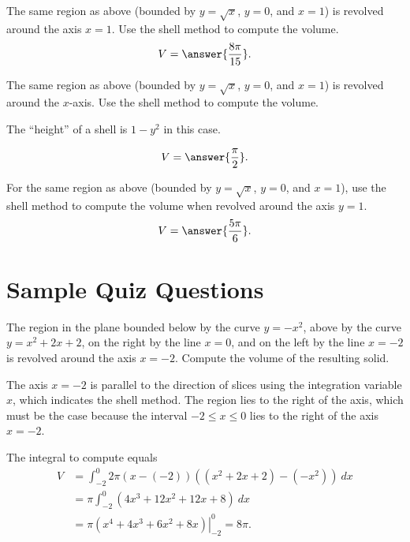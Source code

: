 \documentclass{ximera}
\begin{document}
\begin{exercise}
The same region as above (bounded by $y = \sqrt{x}$, $y=0$, and $x = 1$) is revolved around the axis $x=1$. Use the shell method to compute the volume.
\[ V = \answer{\frac{8 \pi}{15}}. \]
\end{exercise}

\begin{exercise}
The same region as above  (bounded by $y = \sqrt{x}$, $y=0$, and $x = 1$) is revolved around the $x$-axis. Use the shell method to compute the volume.
\begin{hint}
The ``height'' of a shell is $1-y^2$ in this case.
\end{hint}
\[ V = \answer{\frac{\pi}{2}}. \]
\end{exercise}

\begin{exercise}
For the same region as above (bounded by $y = \sqrt{x}$, $y=0$, and $x = 1$), use the shell method to compute the volume when revolved around the axis $y = 1$.
\[ V = \answer{\frac{5 \pi}{6}}. \]
\end{exercise}

\section*{Sample Quiz Questions}

\begin{question}%

The region in the plane bounded below by the curve \(y=-x^2\), above by the curve \(y=x^2+2x+2\), on the right by the line  \(x = 0\), and on the left by the line \(x = -2\) is revolved around the axis \(x = -2\). Compute the volume of the resulting solid.
\begin{multiplechoice}
\choice{\(4\pi\)}
\choice{\(6\pi\)}
\choice[correct]{\(8\pi\)}
\choice{\(10\pi\)}
\choice{\(12\pi\)}
\choice{\(14\pi\)}
\end{multiplechoice}
\begin{feedback}
The axis \(x = -2\) is parallel to the direction of slices using the integration variable \(x\), which indicates the shell method. 
 The region lies to the right of the axis, which must be the case because the interval \(-2 \leq x \leq 0\) lies to the right of the axis \(x = -2\).
 \begin{hint}
The integral to compute equals \[ \begin{aligned} V &= \int_{-2}^{0}2 \pi (x-(-2))((x^2+2x+2)-(-x^2))~ dx\\
& = \pi \int_{-2}^{0} (4x^3+12x^2+12x+8)~ dx\\
& = \pi \left. \left(x^4+4x^3+6x^2+8x\right) \right|_{-2}^{0} = 8\pi. \end{aligned}\]
\end{hint}
\end{feedback}

\end{question}
\end{document}
